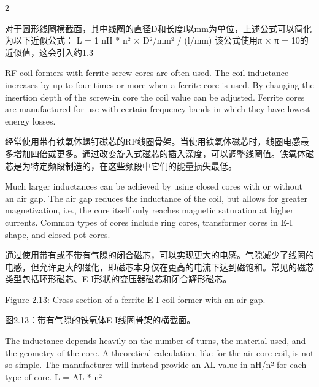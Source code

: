\documentclass{ctexbook}
\begin{document}
\begin{paracol}{2}
\switchcolumn

对于圆形线圈横截面，其中线圈的直径D和长度l以mm为单位，上述公式可以简化为以下近似公式：
L = 1 nH * n² × D²/mm² / (l/mm)
该公式使用π × π = 10的近似值，这会引入约1.3%

\switchcolumn*

RF coil formers with ferrite screw cores are often used. The coil inductance increases by up 
to four times or more when a ferrite core is used. By changing the insertion depth of the 
screw-in core the coil value can be adjusted. Ferrite cores are manufactured for use with 
certain frequency bands in which they have lowest energy losses. 

\switchcolumn

经常使用带有铁氧体螺钉磁芯的RF线圈骨架。当使用铁氧体磁芯时，线圈电感最多增加四倍或更多。通过改变旋入式磁芯的插入深度，可以调整线圈值。铁氧体磁芯是为特定频段制造的，在这些频段中它们的能量损失最低。

\switchcolumn*

Much larger inductances can be achieved by using closed cores with or without an air gap. 
The air gap reduces the inductance of the coil, but allows for greater magnetization, i.e., 
the core itself only reaches magnetic saturation at higher currents. Common types of cores 
include ring cores, transformer cores in E-I shape, and closed pot cores. 

\switchcolumn

通过使用带有或不带有气隙的闭合磁芯，可以实现更大的电感。气隙减少了线圈的电感，但允许更大的磁化，即磁芯本身仅在更高的电流下达到磁饱和。常见的磁芯类型包括环形磁芯、E-I形状的变压器磁芯和闭合罐形磁芯。

\switchcolumn*

Figure 2.13: Cross section of a ferrite E-I coil former with an air gap. 

\switchcolumn

图2.13：带有气隙的铁氧体E-I线圈骨架的横截面。

\switchcolumn*

The inductance depends heavily on the number of turns, the material used, and the geometry of the core. A theoretical calculation, like for the air-core coil, is not so simple. The 
manufacturer will instead provide an AL value in nH/n² for each type of core. 
L = AL * n² 


\end{paracol}
\end{document}
